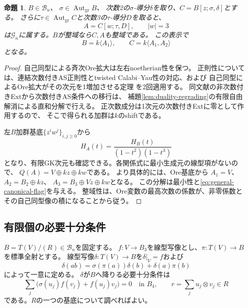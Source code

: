 \documentclass[11pt,a4paper]{ltjsarticle}
\newtheorem{proposition}[theorem]{命題}
\theoremstyle{definition}
\newcommand{\Aut}{\operatorname{Aut}}
\newcommand{\Gclass}{\mathcal G}
\newcommand{\Bclass}{\mathcal B}
\begin{document}
\begin{proposition}\label{prop:ore-construction}
$B\in\Bclass_n$、
$\sigma\in\Aut_{\mathrm{gr}}B$、
次数2の$\sigma$-導分$\delta$を取り、$C=B[z;\sigma,\delta]$とする。
さらに$\tau\in\Aut_{\mathrm{gr}}C$と次数3の$\tau$-導分$D$を取ると、
\[
A=C[w;\tau,D],\qquad |w|=3
\]
は$\Gclass_n$に属する。$B$が整域なら$C,A$も整域である。
この表示で
\begin{equation}\label{eq:general-canonical-flag}
B=k\langle A_1\rangle,\qquad C=k\langle A_1,A_2\rangle
\end{equation}
となる。
\end{proposition}

\begin{proof}
自己同型による斉次Ore拡大は左右noetherian性を保つ。
正則性については、連結次数付きAS正則性とtwisted Calabi--Yau性の対応、および
自己同型によるOre拡大がその次元を1増加させる定理
\cite[\S1.2, Lemma 1.3, Theorem 3.3]{LWW}を2回適用する。
同文献の非次数付きExtから次数付きAS条件への移行は、
補題\ref{lem:duality-regrading}の有限自由解消による直和分解で行える。
正次数成分は1次元の次数付きExtに零として作用するので、
そこで得られる加群は$k$のshiftである。

左$B$加群基底$\{z^iw^j\}_{i,j\geq0}$から
\[
H_A(t)=\frac{H_B(t)}{(1-t^2)(1-t^3)}
\]
となり、有限GK次元も確認できる。各関係式に最小生成元の線型項がないので、
$Q(A)=V\oplus kz\oplus kw$である。
より具体的には、Ore基底から
$A_1=V$、$A_2=B_2\oplus kz$、
$A_3=B_3\oplus Vz\oplus kw$となる。
この分解は最小性と\eqref{eq:general-canonical-flag}を与える。
整域性は、Ore変数の最高次数の係数が、非零係数とその自己同型像の積になることから従う。
\end{proof}

\subsection{有限個の必要十分条件}
$B=T(V)/(R)\in\Bclass_n$を固定する。
$f:V\to B_3$を線型写像とし、$\pi:T(V)\to B$を標準全射とする。
線型写像$\delta:T(V)\to B$を$\delta|_V=f$および
\[
\delta(ab)=\sigma(\pi(a))\delta(b)+\delta(a)\pi(b)
\]
によって一意に定める。
$\delta$が$B$へ降りる必要十分条件は
\begin{equation}\label{eq:general-delta}
\sum_j\bigl(\sigma(u_j)f(v_j)+f(u_j)v_j\bigr)=0
\quad\text{in }B_4,\qquad
r=\sum_j u_j\otimes v_j\in R
\end{equation}
である。$R$の一つの基底について調べればよい。
\end{document}
